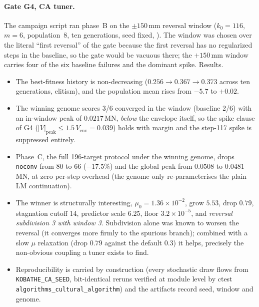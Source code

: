 \paragraph{Gate G4, CA tuner.}
The campaign script ran phase~B on the $\pm150$\,mm reversal window
($k_0{=}116$, $m{=}6$, population~8, ten generations, seed fixed,
). The window was chosen over the literal
``first reversal'' of the gate because the first reversal has no
regularized steps in the baseline, so the gate would be vacuous there;
the $+150$\,mm window carries four of the six baseline failures and the
dominant spike. Results.
%
\begin{itemize}
  \item The best-fitness history is non-decreasing
        ($0.256 \to 0.367 \to 0.373$ across ten generations, elitism),
        and the population mean rises from $-5.7$ to $+0.02$.
  \item The winning genome scores 3/6 converged in the window (baseline
        2/6) with an in-window peak of $0.0217$\,MN, \emph{below} the
        envelope itself, so the spike clause of G4
        ($|V|_{\mathrm{peak}} \le 1.5\,V_{\mathrm{env}} = 0.039$) holds
        with margin and the step-117 spike is suppressed entirely.
  \item Phase~C, the full 196-target protocol under the winning genome,
        drops \texttt{noconv} from 80 to 66 ($-17.5\%$) and the global
        peak from $0.0508$ to $0.0481$\,MN, at zero per-step overhead
        (the genome only re-parameterises the plain LM continuation).
  \item The winner is structurally interesting,
        $\mu_0 = 1.36\times10^{-2}$, grow $5.53$, drop $0.79$,
        stagnation cutoff 14, predictor scale $6.25$, floor
        $3.2\times10^{-5}$, and \emph{reversal subdivision 3 with window
        3}. Subdivision alone was known to worsen the reversal (it
        converges more firmly to the spurious branch); combined with a
        slow $\mu$ relaxation (drop $0.79$ against the default $0.3$)
        it helps, precisely the non-obvious coupling a tuner exists to
        find.
  \item Reproducibility is carried by construction (every stochastic
        draw flows from \texttt{KOBATHE\_CA\_SEED}, bit-identical reruns
        verified at module level by ctest
        \texttt{algorithms\_cultural\_algorithm}) and the artifacts
        record seed, window and genome.
\end{itemize}


